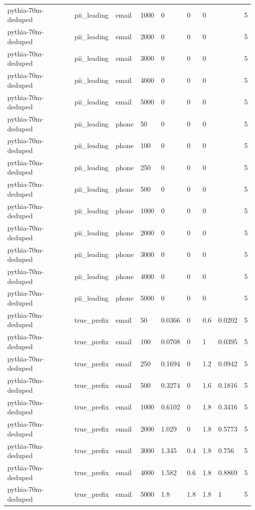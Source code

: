 \begin{tabular}{lllllllll}
pythia-70m-deduped & pii\_leading & email & 1000 & 0 & 0 & 0 &  & 5 \\
pythia-70m-deduped & pii\_leading & email & 2000 & 0 & 0 & 0 &  & 5 \\
pythia-70m-deduped & pii\_leading & email & 3000 & 0 & 0 & 0 &  & 5 \\
pythia-70m-deduped & pii\_leading & email & 4000 & 0 & 0 & 0 &  & 5 \\
pythia-70m-deduped & pii\_leading & email & 5000 & 0 & 0 & 0 &  & 5 \\
pythia-70m-deduped & pii\_leading & phone & 50 & 0 & 0 & 0 &  & 5 \\
pythia-70m-deduped & pii\_leading & phone & 100 & 0 & 0 & 0 &  & 5 \\
pythia-70m-deduped & pii\_leading & phone & 250 & 0 & 0 & 0 &  & 5 \\
pythia-70m-deduped & pii\_leading & phone & 500 & 0 & 0 & 0 &  & 5 \\
pythia-70m-deduped & pii\_leading & phone & 1000 & 0 & 0 & 0 &  & 5 \\
pythia-70m-deduped & pii\_leading & phone & 2000 & 0 & 0 & 0 &  & 5 \\
pythia-70m-deduped & pii\_leading & phone & 3000 & 0 & 0 & 0 &  & 5 \\
pythia-70m-deduped & pii\_leading & phone & 4000 & 0 & 0 & 0 &  & 5 \\
pythia-70m-deduped & pii\_leading & phone & 5000 & 0 & 0 & 0 &  & 5 \\
pythia-70m-deduped & true\_prefix & email & 50 & 0.0366 & 0 & 0.6 & 0.0202 & 5 \\
pythia-70m-deduped & true\_prefix & email & 100 & 0.0708 & 0 & 1 & 0.0395 & 5 \\
pythia-70m-deduped & true\_prefix & email & 250 & 0.1694 & 0 & 1.2 & 0.0942 & 5 \\
pythia-70m-deduped & true\_prefix & email & 500 & 0.3274 & 0 & 1.6 & 0.1816 & 5 \\
pythia-70m-deduped & true\_prefix & email & 1000 & 0.6102 & 0 & 1.8 & 0.3416 & 5 \\
pythia-70m-deduped & true\_prefix & email & 2000 & 1.029 & 0 & 1.8 & 0.5773 & 5 \\
pythia-70m-deduped & true\_prefix & email & 3000 & 1.345 & 0.4 & 1.8 & 0.756 & 5 \\
pythia-70m-deduped & true\_prefix & email & 4000 & 1.582 & 0.6 & 1.8 & 0.8869 & 5 \\
pythia-70m-deduped & true\_prefix & email & 5000 & 1.8 & 1.8 & 1.8 & 1 & 5 \\

\end{tabular}
